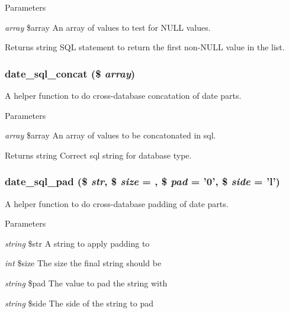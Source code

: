 \begin{DoxyParams}{Parameters}
\item[{\em array}]\$array An array of values to test for NULL values.\end{DoxyParams}
\begin{DoxyReturn}{Returns}
string SQL statement to return the first non-\/NULL value in the list. 
\end{DoxyReturn}
\hypertarget{date__api__sql_8inc_a86684528ccd56b5aadb186bde4978d9c}{
\subsubsection[{date\_\-sql\_\-concat}]{\setlength{\rightskip}{0pt plus 5cm}date\_\-sql\_\-concat (\$ {\em array})}}
\label{date__api__sql_8inc_a86684528ccd56b5aadb186bde4978d9c}
A helper function to do cross-\/database concatation of date parts.


\begin{DoxyParams}{Parameters}
\item[{\em array}]\$array An array of values to be concatonated in sql.\end{DoxyParams}
\begin{DoxyReturn}{Returns}
string Correct sql string for database type. 
\end{DoxyReturn}
\hypertarget{date__api__sql_8inc_aee417d7216dcd7d57a2eaeddc26fd1ae}{
\subsubsection[{date\_\-sql\_\-pad}]{\setlength{\rightskip}{0pt plus 5cm}date\_\-sql\_\-pad (\$ {\em str}, \/  \$ {\em size} = {}, \/  \$ {\em pad} = {\ttfamily '0'}, \/  \$ {\em side} = {\ttfamily 'l'})}}
\label{date__api__sql_8inc_aee417d7216dcd7d57a2eaeddc26fd1ae}
A helper function to do cross-\/database padding of date parts.


\begin{DoxyParams}{Parameters}
\item[{\em string}]\$str A string to apply padding to \item[{\em int}]\$size The size the final string should be \item[{\em string}]\$pad The value to pad the string with \item[{\em string}]\$side The side of the string to pad \end{DoxyParams}
